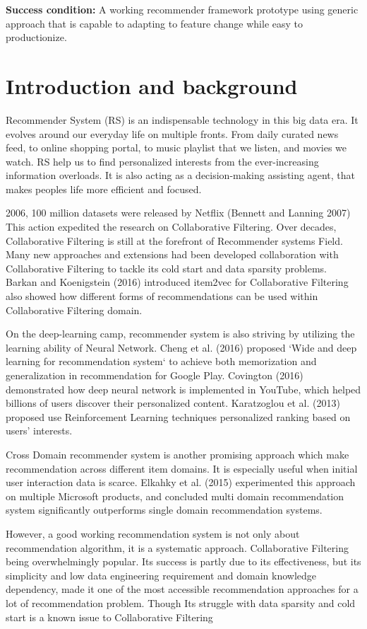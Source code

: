 \documentclass[12pt,a4 paper,title page]{article}
\begin{document}
\textbf{Success condition:} A working recommender framework prototype using generic approach that is capable to  adapting to feature change while easy to productionize.  

\newpage

\section{Introduction and background}
Recommender System (RS) is an indispensable technology in this big data era. It evolves around our everyday life on multiple fronts. From daily curated news feed, to online shopping portal, to music playlist that we listen, and movies we watch. RS help us to find personalized interests from the ever-increasing information overloads. It is also acting as a decision-making assisting agent, that makes peoples life more efficient and focused. 

2006, 100 million datasets were released by Netflix (Bennett and Lanning 2007) This action expedited the research on Collaborative Filtering. Over decades, Collaborative Filtering is still at the forefront of Recommender systems Field. Many new approaches and extensions had been developed collaboration with Collaborative Filtering to tackle its cold start and data sparsity problems. Barkan and Koenigstein (2016) introduced item2vec for Collaborative Filtering also showed how different forms of recommendations can be used within Collaborative Filtering domain. 

On the deep-learning camp, recommender system is also striving by utilizing the learning ability of Neural Network. Cheng et al. (2016) proposed `Wide and deep learning for recommendation system` to achieve both memorization and generalization in recommendation for Google Play. Covington (2016) demonstrated how deep neural network is implemented in YouTube, which helped billions of users discover their personalized content. Karatzoglou et al. (2013) proposed use Reinforcement Learning techniques personalized ranking based on users’ interests.  

Cross Domain recommender system is another promising approach which make recommendation across different item domains. It is especially useful when initial user interaction data is scarce. Elkahky et al. (2015) experimented this approach on multiple Microsoft products, and concluded multi domain recommendation system significantly outperforms single domain recommendation systems. 

However, a good working recommendation system is not only about recommendation algorithm, it is a systematic approach.  Collaborative Filtering being overwhelmingly popular. Its success is partly due to its effectiveness, but its simplicity and low data engineering requirement and domain knowledge dependency, made it one of the most accessible recommendation approaches for a lot of recommendation problem. Though Its struggle with data sparsity and cold start is a known issue to Collaborative Filtering 
\end{document}
